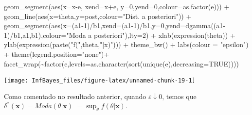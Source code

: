 \documentclass[
]{book}
\newenvironment{Shaded}{\begin{snugshade}}{\end{snugshade}}
\newcommand{\AttributeTok}[1]{\textcolor[rgb]{0.77,0.63,0.00}{#1}}
\newcommand{\ConstantTok}[1]{\textcolor[rgb]{0.00,0.00,0.00}{#1}}
\newcommand{\DecValTok}[1]{\textcolor[rgb]{0.00,0.00,0.81}{#1}}
\newcommand{\FunctionTok}[1]{\textcolor[rgb]{0.00,0.00,0.00}{#1}}
\newcommand{\NormalTok}[1]{#1}
\newcommand{\SpecialCharTok}[1]{\textcolor[rgb]{0.00,0.00,0.00}{#1}}
\newcommand{\StringTok}[1]{\textcolor[rgb]{0.31,0.60,0.02}{#1}}
\begin{document}
\begin{Shaded}
\begin{Highlighting}[]
  \FunctionTok{geom\_segment}\NormalTok{(}\FunctionTok{aes}\NormalTok{(}\AttributeTok{x=}\NormalTok{x}\SpecialCharTok{{-}}\NormalTok{e, }\AttributeTok{xend=}\NormalTok{x}\SpecialCharTok{+}\NormalTok{e, }\AttributeTok{y=}\DecValTok{0}\NormalTok{,}\AttributeTok{yend=}\DecValTok{0}\NormalTok{,}\AttributeTok{colour=}\FunctionTok{as.factor}\NormalTok{(e))) }\SpecialCharTok{+}
  \FunctionTok{geom\_line}\NormalTok{(}\FunctionTok{aes}\NormalTok{(}\AttributeTok{x=}\NormalTok{theta,}\AttributeTok{y=}\NormalTok{post,}\AttributeTok{colour=}\StringTok{"Dist. a posteriori"}\NormalTok{)) }\SpecialCharTok{+}
  \FunctionTok{geom\_segment}\NormalTok{(}\FunctionTok{aes}\NormalTok{(}\AttributeTok{x=}\NormalTok{(a1}\DecValTok{{-}1}\NormalTok{)}\SpecialCharTok{/}\NormalTok{b1,}\AttributeTok{xend=}\NormalTok{(a1}\DecValTok{{-}1}\NormalTok{)}\SpecialCharTok{/}\NormalTok{b1,}\AttributeTok{y=}\DecValTok{0}\NormalTok{,}\AttributeTok{yend=}\FunctionTok{dgamma}\NormalTok{((a1}\DecValTok{{-}1}\NormalTok{)}\SpecialCharTok{/}\NormalTok{b1,a1,b1),}\AttributeTok{colour=}\StringTok{"Moda a posteriori"}\NormalTok{),}\AttributeTok{lty=}\DecValTok{2}\NormalTok{) }\SpecialCharTok{+}
  \FunctionTok{xlab}\NormalTok{(}\FunctionTok{expression}\NormalTok{(theta)) }\SpecialCharTok{+} \FunctionTok{ylab}\NormalTok{(}\FunctionTok{expression}\NormalTok{(}\FunctionTok{paste}\NormalTok{(}\StringTok{"f("}\NormalTok{,theta,}\StringTok{"|x)"}\NormalTok{))) }\SpecialCharTok{+}
  \FunctionTok{theme\_bw}\NormalTok{() }\SpecialCharTok{+} \FunctionTok{labs}\NormalTok{(}\AttributeTok{colour =} \StringTok{"epsilon"}\NormalTok{) }\SpecialCharTok{+} \FunctionTok{theme}\NormalTok{(}\AttributeTok{legend.position=}\StringTok{"none"}\NormalTok{)}\SpecialCharTok{+}
  \FunctionTok{facet\_wrap}\NormalTok{(}\SpecialCharTok{\textasciitilde{}}\FunctionTok{factor}\NormalTok{(e,}\AttributeTok{levels=}\FunctionTok{as.character}\NormalTok{(}\FunctionTok{sort}\NormalTok{(}\FunctionTok{unique}\NormalTok{(e),}\AttributeTok{decreasing=}\ConstantTok{TRUE}\NormalTok{))))}
\end{Highlighting}
\end{Shaded}

\begin{center}\texttt{[image: InfBayes\_files/figure-latex/unnamed-chunk-19-1]} \end{center}

Como comentado no resultado anterior, quando \(\varepsilon \downarrow 0\), temos que \({\delta}^*(\boldsymbol x)=Moda(\theta|\boldsymbol x)\) \(= \displaystyle\sup_{\theta} f(\theta|\boldsymbol x)\).
\end{document}
